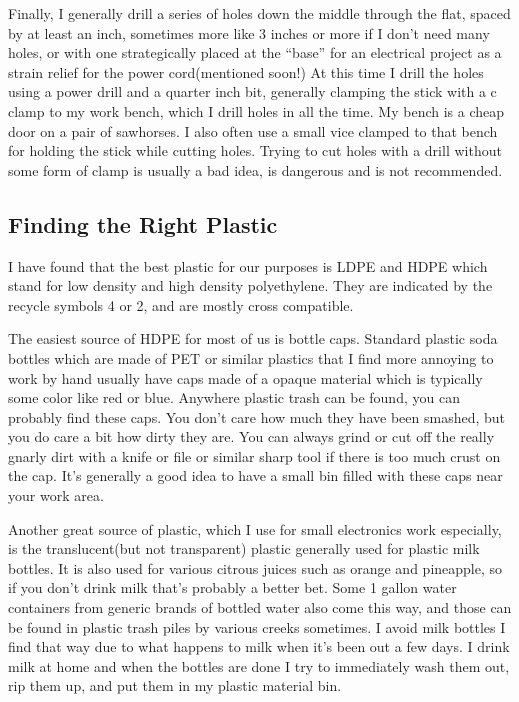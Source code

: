 Finally, I generally drill a series of holes down the middle through the
flat, spaced by at least an inch, sometimes more like 3 inches or more
if I don't need many holes, or with one strategically placed at the
``base'' for an electrical project as a strain relief for the power
cord(mentioned soon!) At this time I drill the holes using a power drill
and a quarter inch bit, generally clamping the stick with a c clamp to
my work bench, which I drill holes in all the time. My bench is a cheap
door on a pair of sawhorses. I also often use a small vice clamped to
that bench for holding the stick while cutting holes. Trying to cut
holes with a drill without some form of clamp is usually a bad idea, is
dangerous and is not recommended.

\subsection{Finding the Right Plastic}\label{finding-the-right-plastic}

I have found that the best plastic for our purposes is LDPE and HDPE
which stand for low density and high density polyethylene. They are
indicated by the recycle symbols 4 or 2, and are mostly cross
compatible.

The easiest source of HDPE for most of us is bottle caps. Standard
plastic soda bottles which are made of PET or similar plastics that I
find more annoying to work by hand usually have caps made of a opaque
material which is typically some color like red or blue. Anywhere
plastic trash can be found, you can probably find these caps. You don't
care how much they have been smashed, but you do care a bit how dirty
they are. You can always grind or cut off the really gnarly dirt with a
knife or file or similar sharp tool if there is too much crust on the
cap. It's generally a good idea to have a small bin filled with these
caps near your work area.

Another great source of plastic, which I use for small electronics work
especially, is the translucent(but not transparent) plastic generally
used for plastic milk bottles. It is also used for various citrous
juices such as orange and pineapple, so if you don't drink milk that's
probably a better bet. Some 1 gallon water containers from generic
brands of bottled water also come this way, and those can be found in
plastic trash piles by various creeks sometimes. I avoid milk bottles I
find that way due to what happens to milk when it's been out a few days.
I drink milk at home and when the bottles are done I try to immediately
wash them out, rip them up, and put them in my plastic material bin.

